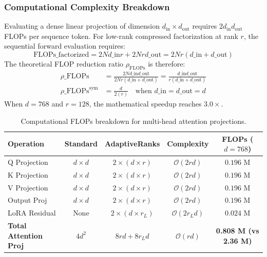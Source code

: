 \subsubsection{Computational Complexity Breakdown}
Evaluating a dense linear projection of dimension $d_{\text{in}} \times d_{\text{out}}$ requires $2 d_{\text{in}} d_{\text{out}}$ FLOPs per sequence token. For low-rank compressed factorization at rank $r$, the sequential forward evaluation requires:
\[
\text{FLOPs}\_{\text{factorized}} = 2 N d\_{\text{in}} r + 2 N r d\_{\text{out}} = 2 N r (d\_{\text{in}} + d\_{\text{out}})
\]
The theoretical FLOP reduction ratio $\rho_{\text{FLOPs}}$ is therefore:
\begin{align}
\rho\_{\text{FLOPs}} &= \frac{2 N d\_{\text{in}} d\_{\text{out}}}{2 N r (d\_{\text{in}} + d\_{\text{out}})} = \frac{d\_{\text{in}} d\_{\text{out}}}{r (d\_{\text{in}} + d\_{\text{out}})} \\
\rho\_{\text{FLOPs}}^{\text{sym}} &= \frac{d}{2(r)} \quad \text{when } d\_{\text{in}} = d\_{\text{out}} = d
\end{align}
When $d = 768$ and $r = 128$, the mathematical speedup reaches $3.0\times$.

\begin{table}[H]
\centering
\small
\begin{tabular}{lcccc}
\toprule
\textbf{Operation} & \textbf{Standard} & \textbf{AdaptiveRanks} & \textbf{Complexity} & \textbf{FLOPs ($d=768$)} \\
\midrule
Q Projection & $d \times d$ & $2 \times (d \times r)$ & $\mathcal{O}(2rd)$ & $0.196$ M \\
K Projection & $d \times d$ & $2 \times (d \times r)$ & $\mathcal{O}(2rd)$ & $0.196$ M \\
V Projection & $d \times d$ & $2 \times (d \times r)$ & $\mathcal{O}(2rd)$ & $0.196$ M \\
Output Proj & $d \times d$ & $2 \times (d \times r)$ & $\mathcal{O}(2rd)$ & $0.196$ M \\
LoRA Residual & None & $2 \times (d \times r_L)$ & $\mathcal{O}(2r_L d)$ & $0.024$ M \\
\midrule
\textbf{Total Attention Proj} & $4 d^2$ & $8rd + 8r_L d$ & $\mathcal{O}(rd)$ & \textbf{0.808 M (vs 2.36 M)} \\
\bottomrule
\end{tabular}
\caption{Computational FLOPs breakdown for multi-head attention projections.}
\end{table}


